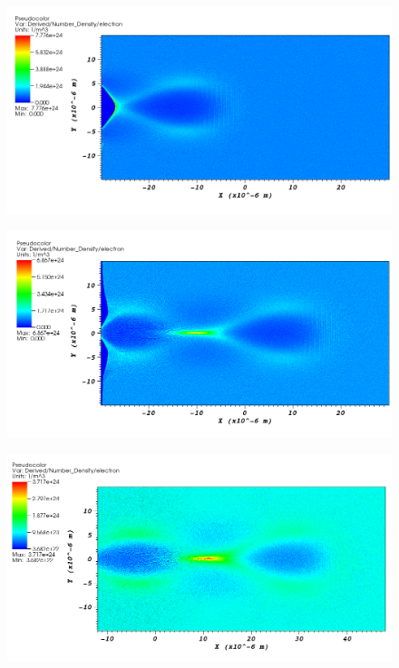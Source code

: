 \documentclass{beamer}
\begin{document}
\begin{frame}
	\begin{figure}
		\includegraphics[width=\textwidth]{lwfa-i18-n-init1-e}
	\end{figure}
\end{frame}

\begin{frame}
	\begin{figure}
		\includegraphics[width=\textwidth]{lwfa-i18-n-mid-e}
	\end{figure}
\end{frame}

\begin{frame}
	\begin{figure}
		\includegraphics[width=\textwidth]{lwfa-i18-n-mid1-e}
	\end{figure}
\end{frame}
\end{document}

